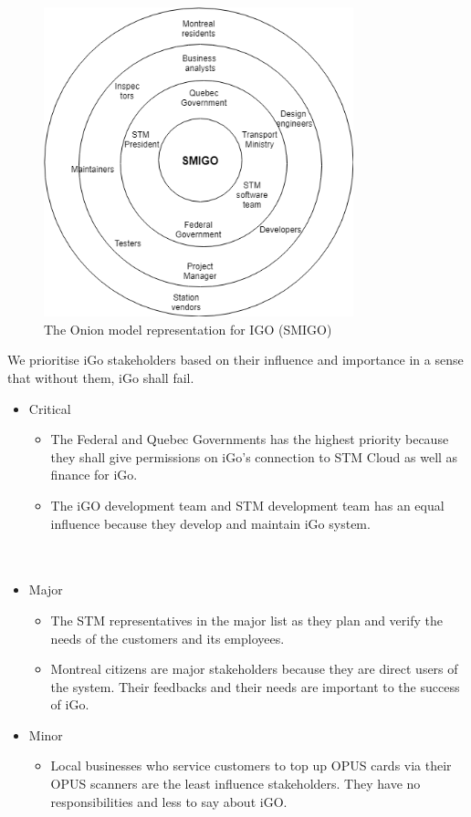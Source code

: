 \documentclass[11pt, english]{article}
\begin{document}
\begin{figure}[H]
  
  \includegraphics[width=0.8\textwidth]{onion.png}
  \centering
  \caption{ The Onion model representation for IGO (SMIGO)}

\end{figure}
We prioritise  iGo stakeholders  based on their influence and importance in a sense that without them, iGo shall fail.
\\
 \begin{itemize}
   \item  Critical
   \begin{itemize}
     \item  The Federal and Quebec Governments has the highest priority because they shall give permissions on iGo’s connection to STM Cloud as well as finance for iGo.
    \item The iGO development team and STM development team has an equal influence because they develop and maintain iGo system.\\ \\ \\
   \end{itemize}
   \item  Major
   \begin{itemize}
     \item  The STM representatives in the major list as they plan and verify the needs of the customers and its employees.
\item Montreal citizens are major stakeholders because they are direct users of the system. Their feedbacks and their needs are important to the success of iGo.

   \end{itemize}
    \item  Minor
   \begin{itemize}
     \item Local businesses who service customers to top up OPUS cards via their OPUS scanners are the least influence stakeholders. They have no responsibilities and less to say about iGO.

   \end{itemize}
 \end{itemize}
 
\end{document}
